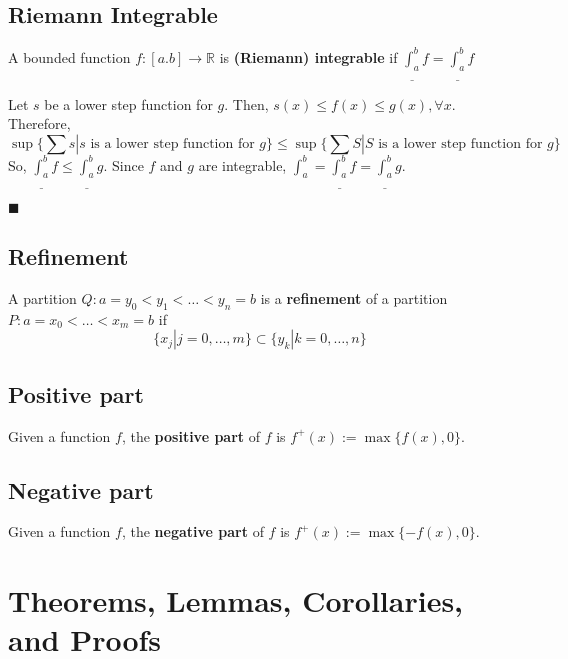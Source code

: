 \documentclass[11pt]{book}
\newcommand{\R}{\mathbb{R}}
\newcommand{\QED}{\begin{flushright}$\blacksquare$\end{flushright}}
\begin{document}
	\subsection{Riemann Integrable}
	\label{subsec:riemannintegrable}
		\begin{defin}
			A bounded function $f:[a.b] \to \R$ is \textbf{(Riemann) integrable} if $\underline{\int_a^b}{f} = \underline{\int_a^b}{f}$
		\end{defin}
		\begin{examp}
			Let $s$ be a lower step function for $g$. Then, $s(x) \leq f(x) \leq g(x), \forall x$. Therefore, 
			$$\sup\{\sum s | s \text{ is a lower step function for } g \} \leq \sup\{\sum S | S \text{ is a lower step function for } g \}$$
			So, $\underline{\int_a^b}{f} \leq \underline{\int_a^b}{g}$. Since $f$ and $g$ are integrable, $\int_a^b = \underline{\int_a^b}{f} = \underline{\int_a^b}{g}$.
			\QED
		\end{examp}

	\subsection{Refinement}
	\label{subsec:refinement}
		\begin{defin}
			A partition $Q: a = y_0 < y_1 < \dots < y_n = b$ is a \textbf{refinement} of a partition $P: a = x_0 < \dots < x_m = b$ if 
			$$\{x_j | j = 0,\dots,m \} \subset \{y_k | k = 0,\dots,n\}$$
		\end{defin}

	\subsection{Positive part}
	\label{subsec:positivepart}
		\begin{defin}
			Given a function $f$, the \textbf{positive part} of $f$ is $f^+(x) := \max{\{f(x),0\}}$.
		\end{defin}
	\subsection{Negative part}
	\label{subsec:negativepart}
		\begin{defin}
			Given a function $f$, the \textbf{negative part} of $f$ is $f^+(x) := \max{\{-f(x),0\}}$.
		\end{defin}
\section{Theorems, Lemmas, Corollaries, and Proofs}
\end{document}
